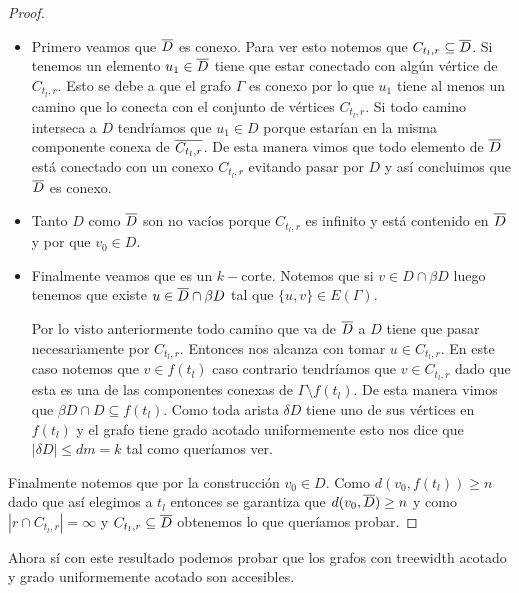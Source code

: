 \documentclass[tesis.tex]{subfiles}
\begin{document}
\begin{proof}
	\begin{itemize}
		\item 	
		Primero veamos que $\overline D$ es conexo.
		Para ver esto notemos que $C_{t_{l},r} \subseteq \overline D$. 
		Si tenemos un elemento $u_1 \in \overline D$ tiene que estar conectado con algún vértice de $C_{t_l, r}$.
		Esto se debe a que el grafo $\Gamma$ es conexo por lo que $u_{1}$ tiene al menos un camino que lo conecta con el conjunto de vértices $C_{t_{l},r}$.
		Si todo camino interseca a $D$ tendríamos que $u_{1} \in D$ porque estarían en la misma componente conexa de $\overline{ C_{t_l, r}}$.
		De esta manera vimos que todo elemento de $\overline D$ está conectado con un conexo $C_{t_l, r}$ evitando pasar por $D$ y así concluimos que $\overline D$ es conexo.
		\item 
		Tanto $D$ como $\overline D$ son no vacíos porque $C_{t_l, r}$ es infinito y está contenido en $\overline D$ y por que $v_0 \in D$.
		\item
		Finalmente veamos que es un $k-$corte.
		Notemos que si $v \in D \cap \beta D$ luego tenemos que existe $u \in \overline D \cap \beta D$ tal que $\{u,v\} \in E(\Gamma)$.
		
		Por lo visto anteriormente todo camino que va de $\overline D$ a $D$ tiene que pasar necesariamente por $C_{t_l, r}$. 
		Entonces nos alcanza con tomar $u \in C_{t_l, r}$.
		En este caso notemos que $v \in f{(t_l)}$ caso contrario tendríamos que $v \in C_{t_l, r}$ dado que esta es una de las componentes conexas de $\Gamma \setminus f{(t_l)}$.
		De esta manera vimos que $\beta D \cap D \subseteq f{(t_l)}$.
		Como toda arista $\delta D$ tiene uno de sus vértices en $f(t_{l})$ y el grafo tiene grado acotado uniformemente esto nos dice que $|\delta D| \le dm = k$ tal como queríamos ver. 
		
	\end{itemize}
	
Finalmente notemos que por la construcción $v_{0} \in D$.
Como $d(v_{0}, f(t_{l})) \ge n$ dado que así elegimos a $t_{l}$ entonces se garantiza que $d(v_{0}, \overline D) \ge n$ y como $|r \cap C_{t_{l},r}| = \infty$ y $C_{t_{l},r} \subseteq \overline D$ obtenemos lo que queríamos probar.
	
\end{proof}

Ahora sí con este resultado podemos probar que los grafos con treewidth acotado y grado uniformemente acotado son accesibles.
\end{document}
